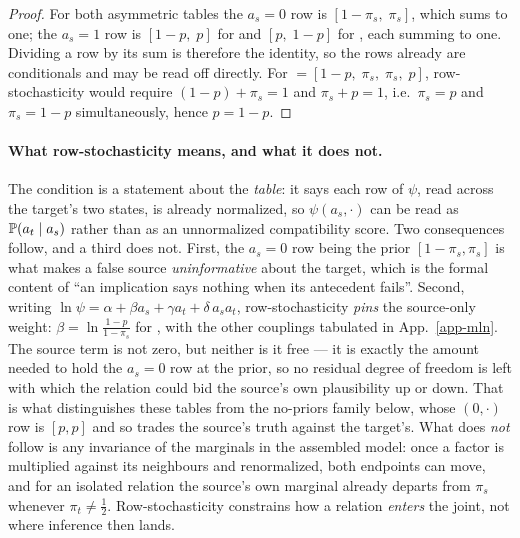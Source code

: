 \begin{proof}
For both asymmetric tables the $a_s{=}0$ row is $[1-\pi_s,\;\pi_s]$, which sums to one; the
$a_s{=}1$ row is $[1-p,\;p]$ for \ent{} and $[p,\;1-p]$ for \con{}, each summing to one. Dividing a
row by its sum is therefore the identity, so the rows already are conditionals and may be read off
directly. For \cnc{} $=[1-p,\;\pi_s,\;\pi_s,\;p]$, row-stochasticity would require
$(1-p)+\pi_s=1$ and $\pi_s+p=1$, i.e.\ $\pi_s=p$ and $\pi_s=1-p$ simultaneously, hence $p=1-p$.
\end{proof}

\paragraph{What row-stochasticity means, and what it does not.} The condition is a statement about
the \emph{table}: it says each row of $\psi$, read across the target's two states, is already
normalized, so $\psi(a_s,\cdot)$ can be read as $\mathbb{P}\!\left( a_t\mid a_s \right)$ rather than as an unnormalized
compatibility score. Two consequences follow, and a third does not. First, the $a_s{=}0$ row being
the prior $[1-\pi_s,\pi_s]$ is what makes a false source \emph{uninformative} about the target,
which is the formal content of ``an implication says nothing when its antecedent fails''. Second,
writing $\ln\psi = \alpha+\beta a_s+\gamma a_t+\delta\,a_s a_t$, row-stochasticity \emph{pins} the
source-only weight: $\beta=\ln\frac{1-p}{1-\pi_s}$ for \ent{}, with the other couplings tabulated in
App.~\ref{app-mln}. The source term is not zero, but neither is it free --- it is exactly the amount
needed to hold the $a_s{=}0$ row at the prior, so no residual degree of freedom is left with which
the relation could bid the source's own plausibility up or down. That is what distinguishes these
tables from the no-priors family below, whose $(0,\cdot)$ row is $[p,p]$ and so trades the source's
truth against the target's. What does \emph{not} follow is any invariance of the marginals in the assembled
model: once a factor is multiplied against its neighbours and renormalized, both endpoints can
move, and for an isolated \ent{} relation the source's own marginal already departs from $\pi_s$
whenever $\pi_t\neq\tfrac12$. Row-stochasticity constrains how a relation \emph{enters} the joint,
not where inference then lands.

